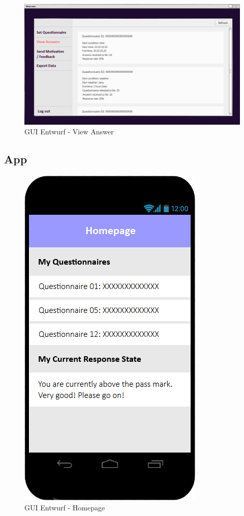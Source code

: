 \documentclass[a4paper]{scrreprt}
\begin{document}
            \begin{figure}[ht]
                \centering
                \includegraphics[scale = 0.25]{web_answer.png}
                \caption{GUI Entwurf - View Answer}
            \end{figure}

        \newpage
        \subsection{App}
            \vspace*{2cm}

            \begin{figure}[ht]
            	\centering
            	\includegraphics[scale = 0.3]{android_home.jpg}
            	\caption{GUI Entwurf - Homepage}
            \end{figure}
\end{document}
